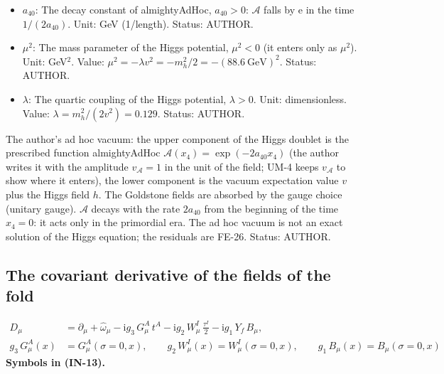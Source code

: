 \documentclass[
  10pt,
]{article}
\begin{document}
\begin{itemize}
  Value: 2.718281828. Status: STANDARD.
\item
  \(a_{40}\): The decay constant of almightyAdHoc, \(a_{40} > 0\):
  \(\mathcal{A}\) falls by \(\mathrm{e}\) in the time \(1/(2a_{40})\).
  Unit: GeV (1/length). Status: AUTHOR.
\item
  \(\mu^2\): The mass parameter of the Higgs potential, \(\mu^2 < 0\)
  (it enters only as \(\mu^2\)). Unit: GeV\(^2\). Value:
  \(\mu^2 = -\lambda v^2 = -m_h^2/2 = -(88.6\ \mathrm{GeV})^2\). Status:
  AUTHOR.
\item
  \(\lambda\): The quartic coupling of the Higgs potential,
  \(\lambda > 0\). Unit: dimensionless. Value:
  \(\lambda = m_h^2/(2v^2) = 0.129\). Status: AUTHOR.
\end{itemize}

The author's ad hoc vacuum: the upper component of the Higgs doublet is
the prescribed function almightyAdHoc
\(\mathcal{A}(x_4) = \exp(-2a_{40}x_4)\) (the author writes it with the
amplitude \(v_{\mathcal{A}} = 1\) in the unit of the field; UM-4 keeps
\(v_{\mathcal{A}}\) to show where it enters), the lower component is the
vacuum expectation value \(v\) plus the Higgs field \(h\). The Goldstone
fields are absorbed by the gauge choice (unitary gauge). \(\mathcal{A}\)
decays with the rate \(2a_{40}\) from the beginning of the time
\(x_4 = 0\): it acts only in the primordial era. The ad hoc vacuum is
not an exact solution of the Higgs equation; the residuals are FE-26.
Status: AUTHOR.

\hypertarget{the-covariant-derivative-of-the-fields-of-the-fold}{%
\subsection{The covariant derivative of the fields of the
fold}\label{the-covariant-derivative-of-the-fields-of-the-fold}}

\[
\begin{aligned}
D_\mu &= \partial_\mu + \hat\omega_\mu - \mathrm{i}g_3\,G^A_\mu\,t^A - \mathrm{i}g_2\,W^I_\mu\,\frac{\tau^I}{2}
 - \mathrm{i}g_1\,Y_f\,B_\mu,\\
g_3\,G^A_\mu(x) &= G^A_\mu(\sigma = 0, x),\qquad g_2\,W^I_\mu(x) = W^I_\mu(\sigma = 0, x),\qquad g_1\,B_\mu(x) = B_\mu(\sigma = 0, x)
\end{aligned} \tag{IN-13}
\] \textbf{Symbols in (IN-13).}
\end{document}
